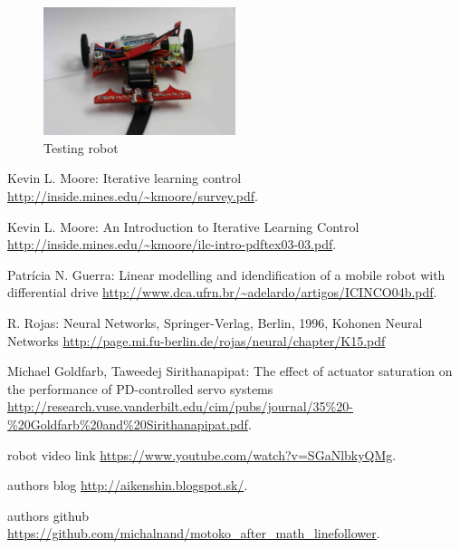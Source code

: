 \documentclass[twoside]{oss-conf-eng}
\begin{document}
\begin{figure}[]
    \centering
    \includegraphics[width=0.5\textwidth]{motoko_aftermath_front.jpg}
    \caption{Testing robot}
    \label{fig:robot}
\end{figure}


\begin{thebibliography}{99}

Kevin L. Moore: Iterative learning control
\url{http://inside.mines.edu/~kmoore/survey.pdf}.

Kevin L. Moore: An Introduction to Iterative Learning Control
\url{http://inside.mines.edu/~kmoore/ilc-intro-pdftex03-03.pdf}.

Patrícia N. Guerra: Linear modelling and idendification of a mobile robot with
differential drive
\url{http://www.dca.ufrn.br/~adelardo/artigos/ICINCO04b.pdf}.

R. Rojas: Neural Networks, Springer-Verlag, Berlin, 1996, Kohonen Neural Networks
\url{http://page.mi.fu-berlin.de/rojas/neural/chapter/K15.pdf}

Michael Goldfarb, Taweedej Sirithanapipat:
The effect of actuator saturation on the performance of PD-controlled servo systems
\url{http://research.vuse.vanderbilt.edu/cim/pubs/journal/35%20-%20Goldfarb%20and%20Sirithanapipat.pdf}.

robot video link
\url{https://www.youtube.com/watch?v=SGaNlbkyQMg}.

authors blog
\url{http://aikenshin.blogspot.sk/}.

authors github
\url{https://github.com/michalnand/motoko_after_math_linefollower}.

\end{thebibliography}
\end{document}
